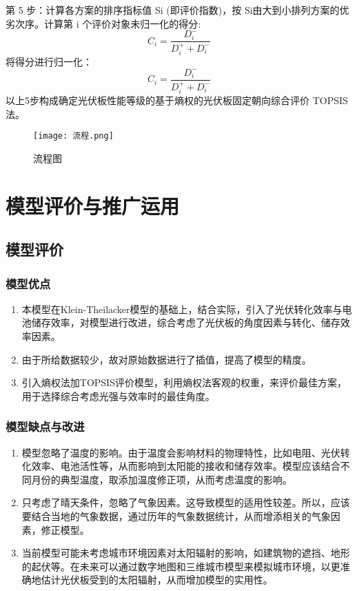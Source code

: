 \documentclass[withoutpreface,bwprint]{cumcmthesis} %
\begin{document}
第 5 步：计算各方案的排序指标值 Si (即评价指数)，按 Si由大到小排列方案的优劣次序。计算第 i 个评价对象未归一化的得分:
$$
C_{i}=\frac{D_{i}^{-}}{D_{i}^{+}+D_{i}^{-}}
$$
将得分进行归一化：
$$
C_{i} = \frac{D_{i}^{-}}{D_{i}^{+} + D_{i}^{-}}
$$
以上5步构成确定光伏板性能等级的基于熵权的光伏板固定朝向综合评价 TOPSIS 法。

\begin{figure}[!h]
	\centering
	\texttt{[image: 流程.png]}
	\caption{流程图}
	\label{fig:002}
\end{figure}

\section{模型评价与推广运用}

\subsection{模型评价}

\subsubsection{模型优点}
\begin{enumerate}
	\item 本模型在Klein-Theilacker模型的基础上，结合实际，引入了光伏转化效率与电池储存效率，对模型进行改进，综合考虑了光伏板的角度因素与转化、储存效率因素。
	\item 由于所给数据较少，故对原始数据进行了插值，提高了模型的精度。
	\item 引入熵权法加TOPSIS评价模型，利用熵权法客观的权重，来评价最佳方案，用于选择综合考虑光强与效率时的最佳角度。
\end{enumerate}

\subsubsection{模型缺点与改进}
\begin{enumerate}
	\item 模型忽略了温度的影响。由于温度会影响材料的物理特性，比如电阻、光伏转化效率、电池活性等，从而影响到太阳能的接收和储存效率。模型应该结合不同月份的典型温度，取添加温度修正项，从而考虑温度的影响。
	\item 只考虑了晴天条件，忽略了气象因素。这导致模型的适用性较差。所以，应该要结合当地的气象数据，通过历年的气象数据统计，从而增添相关的气象因素，修正模型。
	\item 当前模型可能未考虑城市环境因素对太阳辐射的影响，如建筑物的遮挡、地形的起伏等。在未来可以通过数字地图和三维城市模型来模拟城市环境，以更准确地估计光伏板受到的太阳辐射，从而增加模型的实用性。
\end{enumerate}
\end{document}
